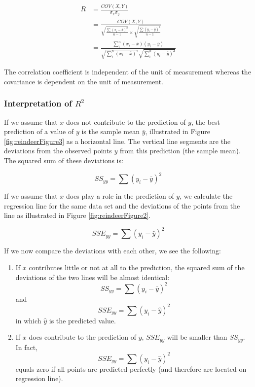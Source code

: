 \begin{align}
  R &=\frac{COV(X,Y)}{\sigma_{x}\sigma_{y}} \\
    &= \frac{COV(X,Y)}{\sqrt{\frac{\sum(x_{i} - \overline{x})^{2}}{n-1}} \times \sqrt{\frac{\sum(y_{i} - \overline{y})^{2}}{n-1}}} \\
    &= \frac{\sum_{i}^{n}(x_{i}-\overline{x})(y_{i} - \overline{y})}{\sqrt{\sum_{i}^{n} (x_{i}-\overline{x})^{2}} \sqrt{\sum_{i}^{n} (y_{i}-\overline{y})^{2}}}
  \label{eq:relative-covariance}
\end{align}

The correlation coefficient is independent of the unit of measurement whereas the covariance is dependent on the unit of measurement.

\subsubsection{Interpretation of $R^{2}$}

If we assume that $x$ does not contribute to the prediction of $y$, the best prediction of a value of $y$ is the sample mean $\overline{y}$, illustrated in Figure \ref{fig:reindeerFigure3} as a horizontal line. The vertical line segments are the deviations from the observed points $y$ from this prediction (the sample mean). The squared sum of these deviations is:

\[ SS_{yy} = \sum(y_{i} - \overline{y})^{2} \]

If we assume that $x$ does play a role in the prediction of $y$, we calculate the regression line for the same data set and the deviations of the points from the line as illustrated in Figure \ref{fig:reindeerFigure2}.

\[ SSE_{yy} = \sum(y_{i} - \widehat{y})^{2} \]

If we now compare the deviations with each other, we see the following:
\begin{enumerate}
  \item If $x$ contributes little or not at all to the prediction, the squared sum of the deviations of the two lines will be almost identical:
    \[ SS_{yy} = \sum(y_{i} - \overline{y})^{2} \] and
    \[ SSE_{yy} = \sum(y_{i} - \widehat{y})^{2} \]
    in which $\widehat{y}$ is the predicted value. 
  \item If $x$ does contribute to the prediction of $y$, $SSE_{yy}$ will be smaller than $SS_{yy}$. In fact,
    \[	SSE_{yy} = \sum(y_{i} - \widehat{y})^{2} \]
    equals zero if all points are predicted perfectly (and therefore are located on regression line).
\end{enumerate}

